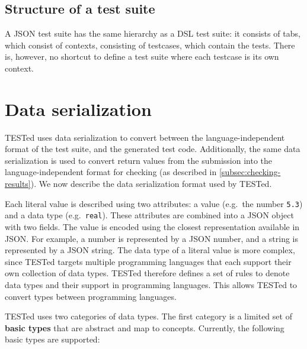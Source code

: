 \documentclass[../main]{subfiles}
\begin{document}
\subsection{Structure of a \json{} test suite}\label{subsec:structure-of-a-json-test-suite}

A JSON test suite has the same hierarchy as a DSL test suite: it consists of tabs, which consist of contexts, consisting of testcases, which contain the tests.
There is, however, no shortcut to define a test suite where each testcase is its own context.

\section{Data serialization}\label{sec:data-serialization}

TESTed uses data serialization to convert between the language-independent format of the test suite, and the generated test code.
Additionally, the same data serialization is used to convert return values from the submission into the language-independent format for checking (as described in \cref{subsec:checking-results}).
We now describe the data serialization format used by TESTed.

Each literal value is described using two attributes: a value (e.g.\ the number \texttt{5.3}) and a data type (e.g.\ \texttt{real}).
These attributes are combined into a JSON object with two fields.
The value is encoded using the closest representation available in JSON\@.
For example, a number is represented by a JSON number, and a string is represented by a JSON string.
The data type of a literal value is more complex, since TESTed targets multiple programming languages that each support their own collection of data types.
TESTed therefore defines a set of rules to denote data types and their support in programming languages.
This allows TESTed to convert types between programming languages.

TESTed uses two categories of data types.
The first category is a limited set of \textbf{basic types} that are abstract and map to concepts.
Currently, the following basic types are supported:
\end{document}

